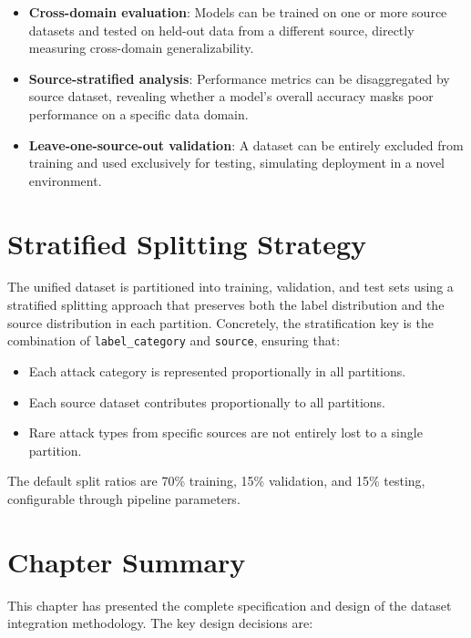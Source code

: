 \begin{itemize}
    \item \textbf{Cross-domain evaluation}: Models can be trained on one or more source datasets and tested on held-out data from a different source, directly measuring cross-domain generalizability.
    \item \textbf{Source-stratified analysis}: Performance metrics can be disaggregated by source dataset, revealing whether a model's overall accuracy masks poor performance on a specific data domain.
    \item \textbf{Leave-one-source-out validation}: A dataset can be entirely excluded from training and used exclusively for testing, simulating deployment in a novel environment.
\end{itemize}

\section{Stratified Splitting Strategy}
\label{sec:splitting}

The unified dataset is partitioned into training, validation, and test sets using a stratified splitting approach that preserves both the label distribution and the source distribution in each partition. Concretely, the stratification key is the combination of \texttt{label\_category} and \texttt{source}, ensuring that:

\begin{itemize}
    \item Each attack category is represented proportionally in all partitions.
    \item Each source dataset contributes proportionally to all partitions.
    \item Rare attack types from specific sources are not entirely lost to a single partition.
\end{itemize}

The default split ratios are 70\% training, 15\% validation, and 15\% testing, configurable through pipeline parameters.

\section{Chapter Summary}
\label{sec:design-summary}

This chapter has presented the complete specification and design of the dataset integration methodology. The key design decisions are:

